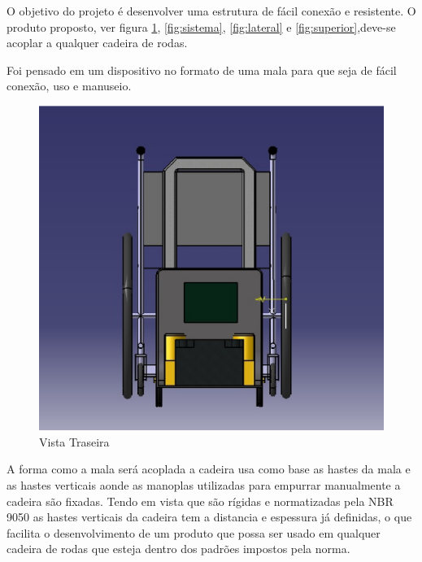 O objetivo do projeto é desenvolver uma estrutura de fácil conexão e resistente. O produto proposto, ver figura \ref{fig:traseira}, \ref{fig:sistema}, \ref{fig:lateral} e \ref{fig:superior},deve-se acoplar a qualquer cadeira de rodas.

Foi pensado em um dispositivo no formato de uma mala para que seja de fácil conexão, uso e manuseio.

\begin{figure}[!htb]
\centering
\includegraphics[keepaspectratio=true,scale=0.4]{figuras/estrutura/vista_traseira}
\caption{Vista Traseira}
\label{fig:traseira}
\end{figure}

A forma como a mala será acoplada a cadeira usa como base as hastes da mala e as hastes verticais aonde as manoplas utilizadas para empurrar manualmente a cadeira são fixadas. Tendo em vista que são rígidas e normatizadas pela NBR 9050 as hastes verticais da cadeira tem a distancia e espessura já definidas, o que facilita o desenvolvimento de um produto que possa ser usado em qualquer cadeira de rodas que esteja dentro dos padrões impostos pela norma.

